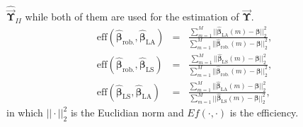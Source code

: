 \documentclass{IJFS}
\begin{document}
$\widehat{\vec{\boldsymbol{\Upsilon}}}_{II}$ while both of them are used for the estimation of
$\vec{\boldsymbol{\Upsilon}}$.
\begin{eqnarray*}
\textrm{eff}(\widehat{\boldsymbol{\beta}}_{\textrm{rob.}},\widehat{\boldsymbol{\beta}}_{\textrm{LA}})&=&
\frac{\sum_{m=1}^M||\widehat{\boldsymbol{\beta}}_{\textrm{LA}}(m)-\boldsymbol\beta||_2^2}
{\sum_{m=1}^M||\widehat{\boldsymbol{\beta}}_{\textrm{rob.}}(m)-\boldsymbol\beta||_2^2},\\
\textrm{eff}(\widehat{\boldsymbol{\beta}}_{\textrm{rob.}},\widehat{\boldsymbol{\beta}}_{\textrm{LS}})&=&
\frac{\sum_{m=1}^M||\widehat{\boldsymbol{\beta}}_{\textrm{LS}}(m)-\boldsymbol\beta||_2^2}
{\sum_{m=1}^M||\widehat{\boldsymbol{\beta}}_{\textrm{rob.}}(m)-\boldsymbol\beta||_2^2},\\
\textrm{eff}(\widehat{\boldsymbol{\beta}}_{\textrm{LS}},\widehat{\boldsymbol{\beta}}_{\textrm{LA}})&=&
\frac{\sum_{m=1}^M||\widehat{\boldsymbol{\beta}}_{\textrm{LA}}(m)-\boldsymbol\beta||_2^2}
{\sum_{m=1}^M||\widehat{\boldsymbol{\beta}}_{\textrm{LS}}(m)-\boldsymbol\beta||_2^2},
\end{eqnarray*}
in which $||\cdot||_2^2$ is the Euclidian norm and $Ef(\cdot,\cdot)$ is the efficiency.
\end{document}
